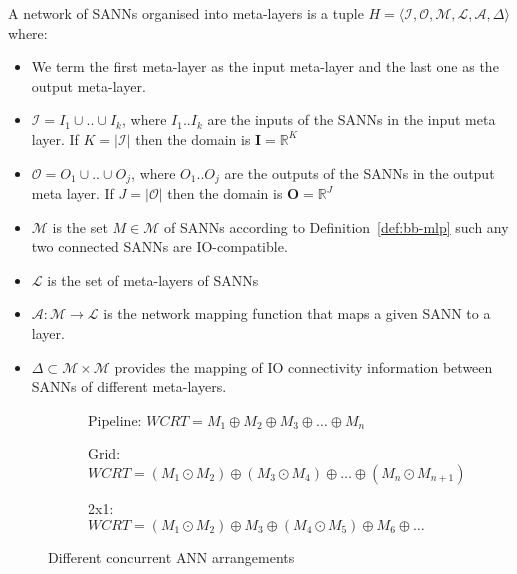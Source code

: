 \begin{definition}
	\label{def:nsanns}
	A network of \acp{SANN} organised into meta-layers is a tuple $H = \langle \mathcal{I}, \mathcal{O}, \mathcal{M}, \mathcal{L}, \mathcal{A}, \Delta \rangle$ where:
	\begin{itemize}
		\item We term the first meta-layer as the input
		meta-layer and the last one as the output
		meta-layer.
		\item  $\mathcal{I}=I_1 \cup .. \cup I_k$,
		where $I_1..I_k$ are the inputs of the \acp{SANN} in
		the input meta layer. If $K=|\mathcal{I}|$ then the
		domain is $\mathbf{I} = \mathbb{R}^K$
		\item $\mathcal{O}=O_1 \cup .. \cup O_j$,
		where $O_1..O_j$ are the outputs of the \acp{SANN} in
		the output meta layer. If $J=|\mathcal{O}|$ then the domain is $\mathbf{O} = \mathbb{R}^J$
		\item $\mathcal{M}$ is the set $M \in \mathcal{M}$ of
		\acp{SANN} according to Definition~\ref{def:bb-mlp}
		such any two connected \acp{SANN} are IO-compatible.
		\item $\mathcal{L}$ is the set of meta-layers of \acp{SANN}
		\item $\mathcal{A}: \mathcal{M} \rightarrow \mathcal{L}$ is the network mapping function that maps a given \ac{SANN} to a layer.
		\item $\Delta \subset \mathcal{M} \times \mathcal{M}$ provides the mapping of IO connectivity information between \acp{SANN} of different meta-layers. %
	\end{itemize}
\end{definition}

\begin{figure}[t]
	\begin{subfigure}[t]{0.5\textwidth}
		\centering
		\scalebox{0.8}{}
		\caption{Pipeline: $WCRT = M_1 \oplus M_2 \oplus M_3 \oplus \ldots \oplus M_n$}
		\label{fig:tca-nn-pipeline}
	\end{subfigure}
	
	\vspace{3mm}
	\begin{subfigure}[t]{0.5\textwidth}
		\centering
		\scalebox{0.8}{}
		\caption{Grid: $WCRT = \left(M_1 \odot M_2\right) \oplus \left(M_3 \odot M_4\right) \oplus \ldots \oplus \left(M_n \odot M_{n+1}\right)$}
		\label{fig:tca-nn-grid}
	\end{subfigure}
	
	\vspace{3mm}
	\begin{subfigure}[t]{0.5\textwidth}
		\centering
		\scalebox{0.8}{}
		\caption{2x1: $WCRT = \left(M_1 \odot M_2\right) \oplus M_3 \oplus \left(M_4 \odot M_5\right) \oplus M_6 \oplus \ldots$}
		\label{fig:tca-nn-someparallel}
	\end{subfigure}
	
	\caption{Different concurrent \ac{ANN} arrangements}
	\label{fig:tca-nn}
\end{figure}

